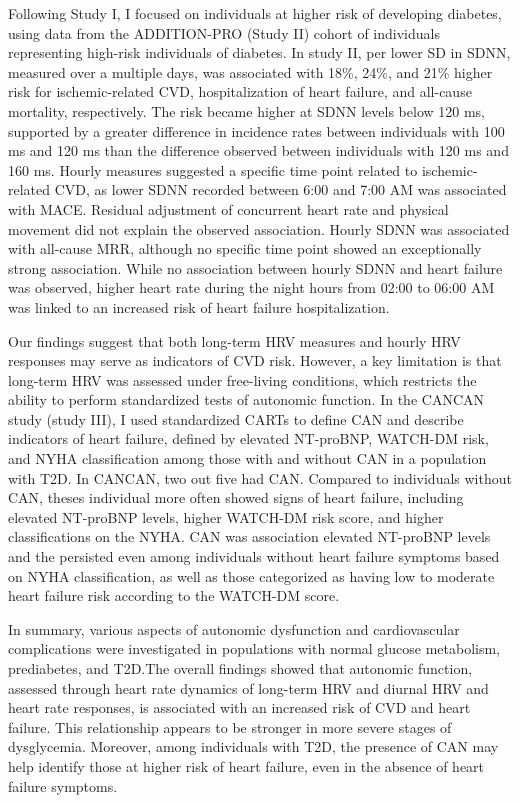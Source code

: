 \documentclass[
  a4paper,
  headsepline=true,
  open=any]{scrbook}
\begin{document}
Following Study I, I focused on individuals at higher risk of developing
diabetes, using data from the ADDITION-PRO (Study II) cohort of
individuals representing high-risk individuals of diabetes. In study II,
per lower SD in SDNN, measured over a multiple days, was associated with
18\%, 24\%, and 21\% higher risk for ischemic-related CVD,
hospitalization of heart failure, and all-cause mortality, respectively.
The risk became higher at SDNN levels below 120 ms, supported by a
greater difference in incidence rates between individuals with 100 ms
and 120 ms than the difference observed between individuals with 120 ms
and 160 ms. Hourly measures suggested a specific time point related to
ischemic-related CVD, as lower SDNN recorded between 6:00 and 7:00 AM
was associated with MACE. Residual adjustment of concurrent heart rate
and physical movement did not explain the observed association. Hourly
SDNN was associated with all-cause MRR, although no specific time point
showed an exceptionally strong association. While no association between
hourly SDNN and heart failure was observed, higher heart rate during the
night hours from 02:00 to 06:00 AM was linked to an increased risk of
heart failure hospitalization.

Our findings suggest that both long-term HRV measures and hourly HRV
responses may serve as indicators of CVD risk. However, a key limitation
is that long-term HRV was assessed under free-living conditions, which
restricts the ability to perform standardized tests of autonomic
function. In the CANCAN study (study III), I used standardized CARTs to
define CAN and describe indicators of heart failure, defined by elevated
NT-proBNP, WATCH-DM risk, and NYHA classification among those with and
without CAN in a population with T2D. In CANCAN, two out five had CAN.
Compared to individuals without CAN, theses individual more often showed
signs of heart failure, including elevated NT-proBNP levels, higher
WATCH-DM risk score, and higher classifications on the NYHA. CAN was
association elevated NT-proBNP levels and the persisted even among
individuals without heart failure symptoms based on NYHA classification,
as well as those categorized as having low to moderate heart failure
risk according to the WATCH-DM score.

In summary, various aspects of autonomic dysfunction and cardiovascular
complications were investigated in populations with normal glucose
metabolism, prediabetes, and T2D.The overall findings showed that
autonomic function, assessed through heart rate dynamics of long-term
HRV and diurnal HRV and heart rate responses, is associated with an
increased risk of CVD and heart failure. This relationship appears to be
stronger in more severe stages of dysglycemia. Moreover, among
individuals with T2D, the presence of CAN may help identify those at
higher risk of heart failure, even in the absence of heart failure
symptoms.
\end{document}
